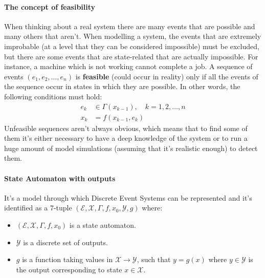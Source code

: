 \documentclass[12pt,a4paper]{article}
\begin{document}
\paragraph{The concept of feasibility} When thinking about a real system there are many events that are possible and many others that aren’t. When modelling a system, the events that are extremely improbable (at a level that they can be considered impossible) must be excluded, but there are some events that are state-related that are actually impossible. For instance, a machine which is not working cannot complete a job. A sequence of events $(e_1,e_2,\dots,e_n)$ is \textbf{feasible} (could occur in reality) only if all the events of the sequence occur in states in which they are possible. In other words, the following conditions must hold:
\begin{align*}
e_k &\in \Gamma (x_{k-1}), \quad k = 1,2,\dots,n \\ 
x_k &= f(x_{k-1},e_k)
\end{align*}
Unfeasible sequences aren’t always obvious, which means that to find some of them it’s either necessary to have a deep knowledge of the system or to run a huge amount of model simulations (assuming that it’s realistic enough) to detect them.

\paragraph{State Automaton with outputs} It’s a model through which Discrete Event Systems can be represented and it’s identified as a 7-tuple $(\mathcal{E},\mathcal{X},\Gamma,f,x_0,\mathcal{Y},g)$ where:
\begin{itemize}
\item $(\mathcal{E},\mathcal{X},\Gamma,f,x_0)$ is a state automaton.
\item $\mathcal{Y}$ is a discrete set of outputs.
\item $g$ is a function taking values in $\mathcal{X}\rightarrow\mathcal{Y}$, such that $y=g(x)$ where $y\in\mathcal{Y}$ is the output corresponding to state $x\in\mathcal{X}$.
\end{itemize}
\end{document}
